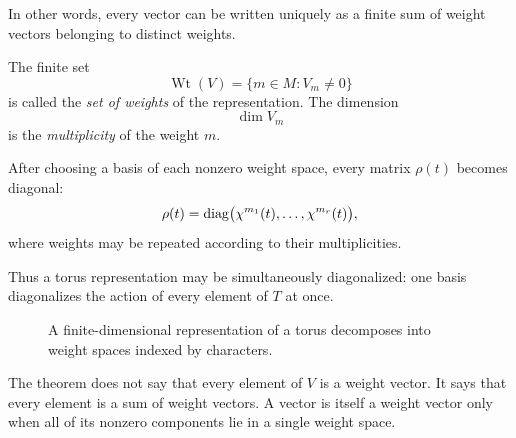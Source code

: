 In other words, every vector can be written uniquely as a finite sum
of weight vectors belonging to distinct weights.

The finite set
\[
\operatorname{Wt}(V)
=
\{m\in M:V_m\neq0\}
\]
is called the \emph{set of weights} of the representation. The
dimension
\[
\dim V_m
\]
is the \emph{multiplicity} of the weight \(m\).

\begin{observation}
After choosing a basis of each nonzero weight space, every matrix
\(\rho(t)\) becomes diagonal:
\[
\rho(t)
=
\operatorname{diag}
\bigl(
\chi^{m_1}(t),\ldots,\chi^{m_r}(t)
\bigr),
\]
where weights may be repeated according to their multiplicities.

Thus a torus representation may be simultaneously diagonalized:
one basis diagonalizes the action of every element of \(T\) at once.
\end{observation}

\begin{figure}[ht]
\centering
{}
\caption{A finite-dimensional representation of a torus decomposes
into weight spaces indexed by characters.}
\label{fig:torus-weight-space-decomposition}
\end{figure}

\begin{warningbox}
The theorem does not say that every element of \(V\) is a weight
vector. It says that every element is a sum of weight vectors. A vector
is itself a weight vector only when all of its nonzero components lie
in a single weight space.
\end{warningbox}

